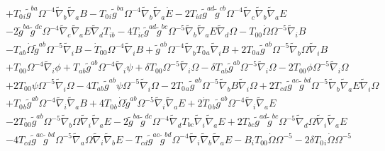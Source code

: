 \documentclass[10pt,letterpaper]{article}
\numberwithin{equation}{section}
\begin{document}
\begin{eqnarray}
&& + T_{0}{}_{i} \tilde{g}^{ba} \Omega^{-4} \tilde{\nabla}_{b}\tilde{\nabla}_{a}B -  T_{0}{}_{i} \tilde{g}^{ba} \Omega^{-4} \tilde{\nabla}_{b}\tilde{\nabla}_{a}\dot{E} - 2 T_{id} \tilde{g}^{ad} \tilde{g}^{cb} \Omega^{-4} \tilde{\nabla}_{c}\tilde{\nabla}_{b}\tilde{\nabla}_{a}E \nonumber \\ 
&& - 2 \tilde{g}^{ba} \tilde{g}^{dc} \Omega^{-4} \tilde{\nabla}_{c}\tilde{\nabla}_{a}E \tilde{\nabla}_{d}T_{ib} - 4 T_{ic} \tilde{g}^{ad} \tilde{g}^{bc} \Omega^{-5} \tilde{\nabla}_{b}\tilde{\nabla}_{a}E \tilde{\nabla}_{d}\Omega -  T_{00}{} \dot{\Omega} \Omega^{-5} \tilde{\nabla}_{i}B \nonumber \\ 
&& -  T_{ab} \dot{\Omega} \tilde{g}^{ab} \Omega^{-5} \tilde{\nabla}_{i}B -  \dot{T}_{00}{} \Omega^{-4} \tilde{\nabla}_{i}B + \tilde{g}^{ab} \Omega^{-4} \tilde{\nabla}_{b}T_{0}{}_{a} \tilde{\nabla}_{i}B + 2 T_{0}{}_{a} \tilde{g}^{ab} \Omega^{-5} \tilde{\nabla}_{b}\Omega \tilde{\nabla}_{i}B \nonumber \\ 
&& + T_{00}{} \Omega^{-4} \tilde{\nabla}_{i}\phi + T_{ab} \tilde{g}^{ab} \Omega^{-4} \tilde{\nabla}_{i}\psi + \delta T_{00}{} \Omega^{-5} \tilde{\nabla}_{i}\Omega -  \delta T_{ab} \tilde{g}^{ab} \Omega^{-5} \tilde{\nabla}_{i}\Omega - 2 T_{00}{} \phi \Omega^{-5} \tilde{\nabla}_{i}\Omega \nonumber \\ 
&& + 2 T_{00}{} \psi \Omega^{-5} \tilde{\nabla}_{i}\Omega - 4 T_{ab} \tilde{g}^{ab} \psi \Omega^{-5} \tilde{\nabla}_{i}\Omega - 2 T_{0}{}_{a} \tilde{g}^{ab} \Omega^{-5} \tilde{\nabla}_{b}B \tilde{\nabla}_{i}\Omega + 2 T_{cd} \tilde{g}^{ac} \tilde{g}^{bd} \Omega^{-5} \tilde{\nabla}_{b}\tilde{\nabla}_{a}E \tilde{\nabla}_{i}\Omega \nonumber \\ 
&& + T_{0}{}_{b} \tilde{g}^{ab} \Omega^{-4} \tilde{\nabla}_{i}\tilde{\nabla}_{a}B + 4 T_{0}{}_{b} \dot{\Omega} \tilde{g}^{ab} \Omega^{-5} \tilde{\nabla}_{i}\tilde{\nabla}_{a}E + 2 \dot{T}_{0}{}_{b} \tilde{g}^{ab} \Omega^{-4} \tilde{\nabla}_{i}\tilde{\nabla}_{a}E \nonumber \\ 
&& - 2 T_{00}{} \tilde{g}^{ab} \Omega^{-5} \tilde{\nabla}_{b}\Omega \tilde{\nabla}_{i}\tilde{\nabla}_{a}E - 2 \tilde{g}^{ba} \tilde{g}^{dc} \Omega^{-4} \tilde{\nabla}_{d}T_{bc} \tilde{\nabla}_{i}\tilde{\nabla}_{a}E + 2 T_{bc} \tilde{g}^{ad} \tilde{g}^{bc} \Omega^{-5} \tilde{\nabla}_{d}\Omega \tilde{\nabla}_{i}\tilde{\nabla}_{a}E \nonumber \\ 
&& - 4 T_{cd} \tilde{g}^{ac} \tilde{g}^{bd} \Omega^{-5} \tilde{\nabla}_{a}\Omega \tilde{\nabla}_{i}\tilde{\nabla}_{b}E -  T_{cd} \tilde{g}^{ac} \tilde{g}^{bd} \Omega^{-4} \tilde{\nabla}_{i}\tilde{\nabla}_{b}\tilde{\nabla}_{a}E- B_{i} T_{00}{} \dot{\Omega} \Omega^{-5} - 2 \delta T_{0}{}_{i} \dot{\Omega} \Omega^{-5} \nonumber \\ 

\end{eqnarray}
\end{document}
